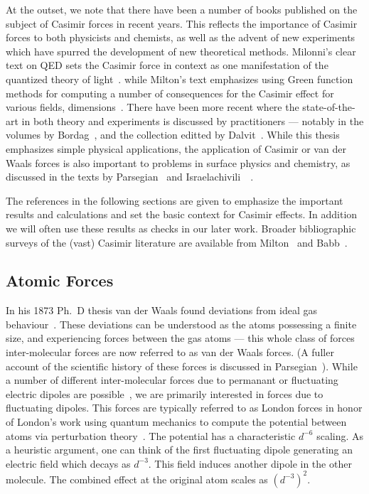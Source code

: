 At the outset, we note that there have been a number of books published on the subject of Casimir forces 
in recent years.  This reflects the importance of Casimir forces to both physicists and chemists, as 
well as the advent of new experiments which have spurred the development of new theoretical methods.  
Milonni's clear text on QED sets the Casimir force in context as one manifestation of the quantized theory of light~\cite{Milonni1994}.
while Milton's text emphasizes using Green function methods for computing a number of consequences for 
the Casimir effect for various fields, dimensions~\cite{Milton2001}.  There have been more recent
where the state-of-the-art in both theory and experiments is discussed by practitioners --- 
notably in the volumes by Bordag~\etal\cite{Bordag2009}, 
and the collection editted by Dalvit~\etal\cite{Dalvit2011}.  
While this thesis emphasizes simple physical applications, the application of Casimir or 
van der Waals forces is also important to problems in surface physics and chemistry, as discussed in the texts by 
 Parsegian~\cite{Parsegian2006} and Israelachivili~\etal~\cite{Israelachvili2011}.

The references in the following sections are given to emphasize the important results and calculations
and set the basic context for Casimir effects.   In addition we will often use these results 
as checks in our later work.  Broader bibliographic surveys of the (vast) Casimir literature
are available from Milton~\cite{Milton-bib} and Babb~\cite{Babb-bib}.

\subsection{Atomic Forces}

In his 1873 Ph.~D thesis van der Waals found deviations from ideal gas behaviour~\cite{vanderWaals}.
These deviations can be understood as the atoms possessing a finite size, and experiencing forces between the gas atoms 
--- this whole class of forces inter-molecular forces are now referred to as van der Waals forces.
(A fuller account of the scientific history of these forces is discussed in Parsegian~\cite{Parsegian2006}).
While a number of different inter-molecular forces due to permanant
 or fluctuating electric dipoles are possible~\cite{Israelachvili2011},
we are primarily interested in forces due to fluctuating dipoles.  
This forces are typically referred to as London forces in honor of London's work
 using quantum mechanics to compute the potential between atoms via perturbation theory~\cite{London1930}.  
The potential has a characteristic $d^{-6}$ scaling.  As a heuristic argument, one can think of
 the first fluctuating dipole generating an electric field which decays as $d^{-3}$.  This field induces another
dipole in the other molecule.  The combined effect at the original atom scales as $(d^{-3})^2$.  


